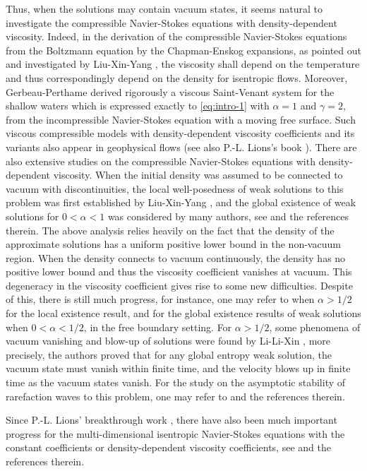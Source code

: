 \documentclass[11pt, reqno]{amsart}
\numberwithin{equation}{section}
\begin{document}
Thus, when the solutions may contain vacuum states, it seems natural to investigate
the compressible Navier-Stokes equations with density-dependent viscosity.
Indeed, in the derivation of the
compressible Navier-Stokes equations from the Boltzmann equation by the Chapman-Enskog expansions,
as pointed out and investigated by Liu-Xin-Yang \cite{MR1485360}, the viscosity shall depend on the temperature and thus correspondingly depend on the density for isentropic flows.
Moreover, Gerbeau-Perthame \cite{MR1821555} derived rigorously a viscous Saint-Venant system for the shallow waters
which is expressed exactly to \eqref{eq:intro-1} with \(\alpha=1\) and \(\gamma=2\),  from the incompressible Navier-Stokes equation with a moving free surface. Such viscous compressible models with density-dependent viscosity coefficients and its variants also appear in geophysical flows \cite{MR1978317, MR1989675, MR2257849} (see also P.-L. Lions's book \cite{MR1637634}).
There are also extensive studies on the compressible Navier-Stokes equations with density-dependent viscosity.
When the initial density was assumed to be connected to vacuum with
discontinuities,
the local well-posedness of weak solutions to this problem was first established by Liu-Xin-Yang \cite{MR1485360}, and
the global existence of weak solutions for \(0<\alpha<1\) was considered by many authors,
see \cite{MR2254008} and the references therein. The above analysis relies heavily
on the fact that the density 
of the approximate solutions has a uniform positive lower bound in the non-vacuum region. 
When the density connects to
vacuum continuously, the density has no positive lower bound and thus the viscosity
coefficient vanishes at vacuum. This degeneracy in the viscosity coefficient gives rise to
some new difficulties. Despite of this, there is still much progress, for instance, one may refer to \cite{MR1929151} when \(\alpha>1/2\) for the local existence result, and \cite{MR1990849} for the global existence results of
weak solutions when \(0<\alpha<1/2\), in the free boundary
setting.
For \(\alpha>1/2\), some phenomena of vacuum vanishing and blow-up of solutions were found by Li-Li-Xin \cite{MR2410901}, more precisely, the authors proved that for any global entropy weak solution, the vacuum state must vanish within finite time, and the velocity blows up in finite time as the vacuum states vanish.
For the study on the asymptotic stability of rarefaction waves to this problem, one may refer to \cite{MR3116645} and the references therein.

Since P.-L. Lions' breakthrough work \cite{MR1226126, MR1637634},
there have also been much important progress for the multi-dimensional isentropic Navier-Stokes equations with the constant coefficients or density-dependent viscosity coefficients, see \cite{MR1779621, MR2914266, MR3862947, MR1978317, MR1867887, MR2877344,
LX2015, MR1810944, MR0564670, MR3573976, MR4011697, MR4195559} and the references therein.
\end{document}
